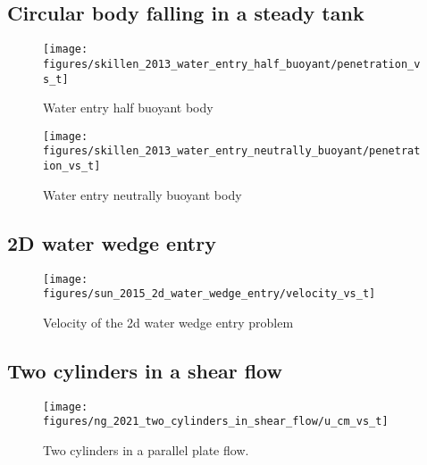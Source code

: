\documentclass[preprint,12pt]{elsarticle}
\begin{document}
\FloatBarrier%
\subsection{Circular body falling in a steady tank}
\label{sec:res:circular-body-entry}


\begin{figure}[!htpb]
  \centering
  \texttt{[image: figures/skillen\_2013\_water\_entry\_half\_buoyant/penetration\_vs\_t]}
  \caption{Water entry half buoyant body}
\label{fig:xxxx}
\end{figure}

\begin{figure}[!htpb]
  \centering
  \texttt{[image: figures/skillen\_2013\_water\_entry\_neutrally\_buoyant/penetration\_vs\_t]}
  \caption{Water entry neutrally buoyant body}
\label{fig:xxxx}
\end{figure}

\citet{skillen_incompressible_2013}


\FloatBarrier%
\subsection{2D water wedge entry}
\label{sec:res:wedge_entry}

\citet{sun_numerical_2015}

\begin{figure}[!htpb]
  \centering
  \texttt{[image: figures/sun\_2015\_2d\_water\_wedge\_entry/velocity\_vs\_t]}
  \caption{Velocity of the 2d water wedge entry problem}
\label{fig:xxxx}
\end{figure}


\FloatBarrier%
\subsection{Two cylinders in a shear ﬂow}
\label{sec:res:hpf}

\citet{ng_numerical_2021}

\begin{figure}[!htpb]
  \centering
  \texttt{[image: figures/ng\_2021\_two\_cylinders\_in\_shear\_flow/u\_cm\_vs\_t]}
  \caption{Two cylinders in a parallel plate flow.}
\label{fig:xxx}
\end{figure}
\end{document}
